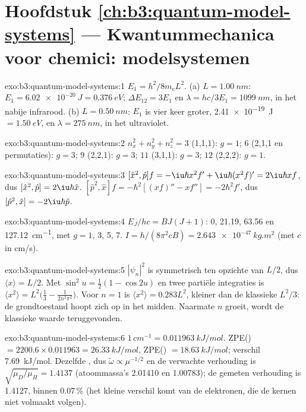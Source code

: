\section*{Hoofdstuk \ref{ch:b3:quantum-model-systems} --- Kwantummechanica voor chemici: modelsystemen}

\begin{solution}{exo:b3:quantum-model-systems:1}
$E_1 = h^2/8m_eL^2$. (a) $L = \qty{1.00}{nm}$: $E_1 = \qty{6.02e-20}{J} =
\qty{0.376}{eV}$; $\Delta E_{12} = 3E_1$ en $\lambda = hc/3E_1 =
\qty{1099}{nm}$, in het nabije infrarood. (b) $L = \qty{0.50}{nm}$: $E_1$ is vier
keer groter, \qty{2.41e-19}{J} $= \qty{1.50}{eV}$, en $\lambda =
\qty{275}{nm}$, in het ultraviolet.
\end{solution}

\begin{solution}{exo:b3:quantum-model-systems:2}
$n_x^2 + n_y^2 + n_z^2 = 3$ (1,1,1): $g = 1$; $6$ (2,1,1 en permutaties):
$g = 3$; $9$ (2,2,1): $g = 3$; $11$ (3,1,1): $g = 3$; $12$ (2,2,2): $g = 1$.
\end{solution}

\begin{solution}{exo:b3:quantum-model-systems:3}
$[\hat x^2,\hat p]f = -\iu\hbar x^2f' + \iu\hbar(x^2f)' = 2\iu\hbar xf$, dus
$[\hat x^2,\hat p] = 2\iu\hbar\hat x$. $[\hat p^2,\hat x]f = -\hbar^2[(xf)'' -
xf''] = -2\hbar^2f'$, dus $[\hat p^2,\hat x] = -2\iu\hbar\hat p$.
\end{solution}

\begin{solution}{exo:b3:quantum-model-systems:4}
$E_J/hc = BJ(J+1)$: 0, 21.19, 63.56 en \qty{127.12}{cm^{-1}}, met $g = 1$,
3, 5, 7. $I = h/(8\pi^2cB) = \qty{2.643e-47}{kg.m^2}$ (met $c$ in
\unit{cm/s}).
\end{solution}

\begin{solution}{exo:b3:quantum-model-systems:5}
$|\psi_n|^2$ is symmetrisch ten opzichte van $L/2$, dus $\langle x\rangle = L/2$. Met
$\sin^2u = \frac12(1 - \cos2u)$ en twee partiële integraties is
$\langle x^2\rangle = L^2\big(\frac13 - \frac{1}{2n^2\pi^2}\big)$. Voor $n = 1$ is
$\langle x^2\rangle = 0.283L^2$, kleiner dan de klassieke $L^2/3$: de
grondtoestand hoopt zich op in het midden. Naarmate $n$ groeit, wordt de
klassieke waarde teruggevonden.
\end{solution}

\begin{solution}{exo:b3:quantum-model-systems:6}
$1\,\unit{cm^{-1}} = \qty{0.011963}{kJ/mol}$. ZPE() $= 2200.6 \times
0.011963 = \qty{26.33}{kJ/mol}$, ZPE() $= \qty{18.63}{kJ/mol}$; verschil
\qty{7.69}{kJ/mol}. Dezelfde , dus $\tilde\omega \propto \mu^{-1/2}$
en de verwachte verhouding is $\sqrt{\mu_D/\mu_H} = 1.4137$ (atoommassa's
2.01410 en 1.00783); de gemeten verhouding is 1.4127, binnen 0.07\,\% (het
kleine verschil komt van de elektronen, die de kernen niet volmaakt
volgen).
\end{solution}

